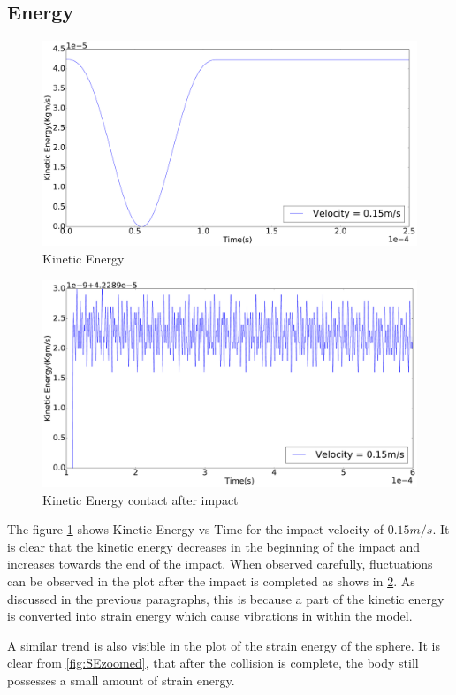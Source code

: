 \subsection{Energy}
\begin{figure}[H]
\includegraphics[width=1.0\textwidth]{../images/KE/KE_pdf.pdf}
\caption{Kinetic Energy}
\label{fig:KE}
\end{figure}
\begin{figure}[H]
\includegraphics[width=1.0\textwidth]{../images/KE/KEzoomed_pdf.pdf}
\caption{Kinetic Energy contact after impact}
\label{fig:KEzoomed}
\end{figure}
The figure \ref{fig:KE} shows Kinetic Energy vs Time for the impact velocity of $0.15m/s$. It is clear that the kinetic energy decreases in the beginning of the impact and increases towards the end of the impact. When observed carefully, fluctuations can be observed in the plot after the impact is completed as shows in \ref{fig:KEzoomed}. As discussed in the previous paragraphs, this is because a part of the kinetic energy is converted into strain energy which cause vibrations in within the model.

A similar trend is also visible in the plot of the strain energy of the sphere. It is clear from \ref{fig:SEzoomed}, that after the collision is complete, the body still possesses a small amount of strain energy.

